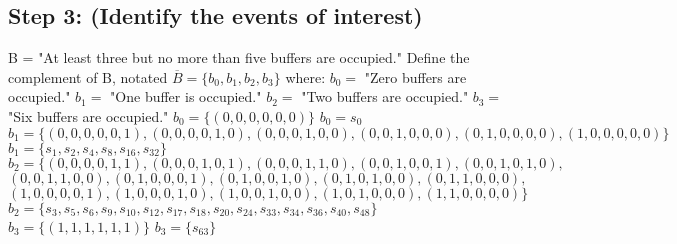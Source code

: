 \documentclass[a4paper,10pt]{article}
\begin{document}
\subsection{Step 3: (Identify the events of interest)}
B = "At least three but no more than five buffers are occupied." \newline
Define the complement of B, notated $ \overline{B} = \{b_{0}, b_{1}, b_{2}, b_{3}\} $ where: \newline
$ b_{0} = $ "Zero buffers are occupied." \newline
$ b_{1} = $ "One buffer is occupied." \newline
$ b_{2} = $ "Two buffers are occupied." \newline
$ b_{3} = $ "Six buffers are occupied." \newline
$ b_{0} = \{(0,0,0,0,0,0)\} $ \newline
$ b_{0} = s_{0} $ \newline
$ b_{1} = \{(0,0,0,0,0,1),(0,0,0,0,1,0),(0,0,0,1,0,0),(0,0,1,0,0,0),(0,1,0,0,0,0),(1,0,0,0,0,0)\} $ \newline
$ b_{1} = \{s_{1}, s_{2}, s_{4}, s_{8}, s_{16}, s_{32}\} $ \newline
$ b_{2} = \{(0,0,0,0,1,1),(0,0,0,1,0,1),(0,0,0,1,1,0),(0,0,1,0,0,1),(0,0,1,0,1,0), $ \newline
$ (0,0,1,1,0,0),(0,1,0,0,0,1),(0,1,0,0,1,0),(0,1,0,1,0,0),(0,1,1,0,0,0), $ \newline
$ (1,0,0,0,0,1),(1,0,0,0,1,0),(1,0,0,1,0,0),(1,0,1,0,0,0),(1,1,0,0,0,0)\} $ \newline
$ b_{2} = \{s_{3}, s_{5}, s_{6}, s_{9}, s_{10}, s_{12}, s_{17}, s_{18}, s_{20}, s_{24}, s_{33}, s_{34}, s_{36}, 
s_{40}, s_{48}\} $ \newline
$ b_{3} = \{(1,1,1,1,1,1)\} $ \newline
$ b_{3} = \{s_{63}\} $
\end{document}
